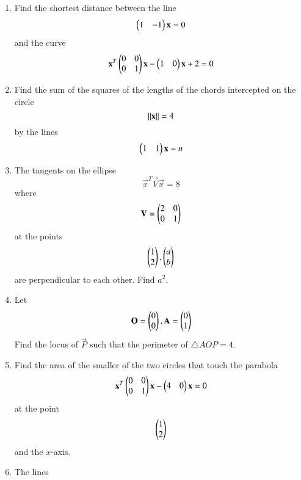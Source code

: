 \documentclass[journal,12pt,twocolumn]{IEEEtran}
\begin{document}
\begin{enumerate}[label=\arabic*.]
\begin{enumerate}
\end{enumerate}
\item Find the shortest distance between the line 
\begin{equation}
\begin{pmatrix}1 & -1 \end{pmatrix}\mathbf{x}  =0
\end{equation}
%
and the curve
\begin{equation}
\mathbf{x}^T\begin{pmatrix}0 & 0 \\ 0 & 1\end{pmatrix}\mathbf{x} - \begin{pmatrix}1 & 0\end{pmatrix}\mathbf{x} + 2 =0
\end{equation}
%
\item Find the sum of the squares of the lengths of the chords intercepted on the circle 
\begin{equation}
\left\Vert\mathbf{x}\right\Vert= 4
\end{equation}
by the lines
\begin{equation}
\begin{pmatrix}1 & 1 \end{pmatrix}\mathbf{x}  =n
\end{equation}
\item The tangents on the ellipse
\begin{equation}
\vec{x}^T\vec{V}\vec{x} =8
\end{equation}
%
where
\begin{equation}
\mathbf{V} = \begin{pmatrix}2 & 0 \\ 0 & 1\end{pmatrix}
\end{equation}
at the points 
\begin{equation}
 \begin{pmatrix}1 \\ 2\end{pmatrix}, \begin{pmatrix}a \\ b\end{pmatrix}
\end{equation}
%
are perpendicular to each other. Find $a^2$.
\item Let 
\begin{equation}
\mathbf{O} = \begin{pmatrix} 0 \\ 0 \end{pmatrix},
\mathbf{A} = \begin{pmatrix} 0 \\ 1 \end{pmatrix}
\end{equation}
Find the locus of $\vec{P}$ such that the perimeter of $\triangle AOP = 4$.
\item Find the area of the smaller of the two circles that touch the parabola 
\begin{equation}
\mathbf{x}^T\begin{pmatrix}0 & 0 \\ 0 & 1\end{pmatrix}\mathbf{x} - \begin{pmatrix}4 & 0\end{pmatrix}\mathbf{x}  =0
\end{equation}
at the point 
\begin{equation}
\begin{pmatrix} 1 \\ 2 \end{pmatrix}
\end{equation}
and the $x$-axis.
\item The lines 
\begin{align}

\end{align}
\end{enumerate}
\end{document}
